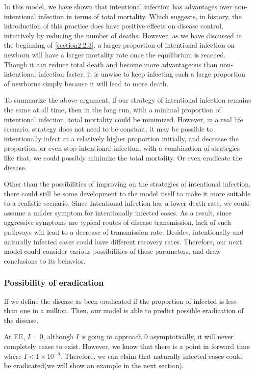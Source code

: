 \documentclass[12pt]{article}
\begin{document}
In this model, we have shown that intentional infection has advantages over non-intentional infection in terms of total mortality. Which suggests, in history, the introduction of this practice does have positive effects on disease control, intuitively by reducing the number of deaths. However, as we have discussed in the beginning of \autoref{section2.2.3}, a larger proportion of intentional infection on newborn will have a larger mortality rate once the equilibrium is reached. Though it can reduce total death and become more advantageous than non-intentional infection faster, it is unwise to keep infecting such a large proportion of newborns simply because it will lead to more death. 

To summarize the above argument, if our strategy of intentional infection remains the same at all time, then in the long run, with a minimal proportion of intentional infection, total mortality could be minimized. However, in a real life scenario, strategy does not need to be constant, it may be possible to intentionally infect at a relatively higher proportion initially, and decrease the proportion, or even stop intentional infection, with a combination of strategies like that, we could possibly minimize the total mortality. Or even eradicate the disease.

Other than the possibilities of improving on the strategies of intentional infection, there could still be some development to the model itself to make it more suitable to a realistic scenario. Since Intentional infection has a lower death rate, we could assume a milder symptom for intentionally infected cases. As a result, since aggressive symptoms are typical routes of disease transmission, lack of such pathways will lead to a decrease of transmission rate. Besides, intentionally and naturally infected cases could have different recovery rates. Therefore, our next model could consider various possibilities of these parameters, and draw conclusions to its behavior.

\subsubsection{Possibility of eradication}
If we define the disease as been eradicated if the proportion of infected is less than one in a million. Then, our model is able to predict possible eradication of the disease.

At EE, $I=0$, although $I$ is going to approach 0 asymptotically, it will never completely cease to exist. However, we know that there is a point in forward time where $I<1\times10^{-6}$. Therefore, we can claim that naturally infected cases could be eradicated(we will show an example in the next section).
\end{document}
